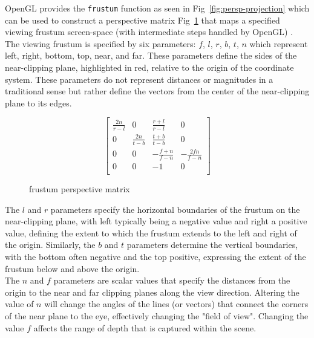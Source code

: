 OpenGL provides the \texttt{frustum} function as seen in Fig~\ref{fig:persp-projection} which can be used to construct a perspective matrix Fig~\ref{fig:perspective-matrix} that maps a specified viewing frustum screen-space (with intermediate steps handled by OpenGL) \cite{hearn2004computer}. The viewing frustum is specified by six parameters: $f$, $l$, $r$, $b$, $t$, $n$ which represent left, right, bottom, top, near, and far. These parameters define the sides of the near-clipping plane, highlighted in red, relative to the origin of the coordinate system. These parameters do not represent distances or magnitudes in a traditional sense but rather define the vectors from the center of the near-clipping plane to its edges. \\

\begin{figure}[H]
    \[
        \begin{bmatrix}
            \frac{2n}{r-l} & 0              & \frac{r+l}{r-l}  & 0                \\
            0              & \frac{2n}{t-b} & \frac{t+b}{t-b}  & 0                \\
            0              & 0              & -\frac{f+n}{f-n} & -\frac{2fn}{f-n} \\
            0              & 0              & -1               & 0                \\
        \end{bmatrix}
    \]
    \caption{frustum perspective matrix}
    \label{fig:perspective-matrix}
\end{figure}

The $l$ and $r$ parameters specify the horizontal boundaries of the frustum on the near-clipping plane, with left typically being a negative value and right a positive value, defining the extent to which the frustum extends to the left and right of the origin. Similarly, the $b$ and $t$ parameters determine the vertical boundaries, with the bottom often negative and the top positive, expressing the extent of the frustum below and above the origin. \\

The $n$ and $f$ parameters are scalar values that specify the distances from the origin to the near and far clipping planes along the view direction. Altering the value of $n$ will change the angles of the lines (or vectors) that connect the corners of the near plane to the eye, effectively changing the "field of view". Changing the value $f$ affects the range of depth that is captured within the scene. \\

